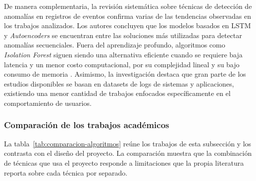 De manera complementaria, la revisión sistemática sobre técnicas de detección de anomalías en registros de eventos \parencite{Landauer2023Survey} confirma varias de las tendencias observadas en los trabajos analizados. Los autores concluyen que los modelos basados en LSTM y \emph{Autoencoders} se encuentran entre las soluciones más utilizadas para detectar anomalías secuenciales. Fuera del aprendizaje profundo, algoritmos como \emph{Isolation Forest} siguen siendo una alternativa eficiente cuando se requiere baja latencia y un menor costo computacional, por su complejidad lineal y su bajo consumo de memoria \parencite{Liu2008}. Asimismo, la investigación destaca que gran parte de los estudios disponibles se basan en datasets de logs de sistemas y aplicaciones, existiendo una menor cantidad de trabajos enfocados específicamente en el comportamiento de usuarios.

\subsubsection{Comparación de los trabajos académicos}\label{sec:comparacion-algoritmos}
La tabla~\ref{tab:comparacion-algoritmos} reúne los trabajos de esta subsección y los contrasta con el diseño del proyecto. La comparación muestra que la combinación de técnicas que usa el proyecto responde a limitaciones que la propia literatura reporta sobre cada técnica por separado.

